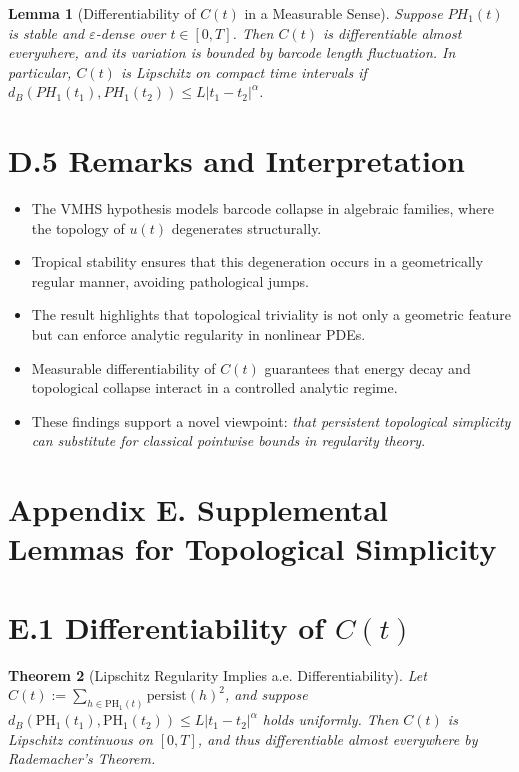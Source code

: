 \documentclass[11pt]{article}
\newtheorem{theorem}{Theorem}[section]
\newtheorem{lemma}[theorem]{Lemma}
\theoremstyle{definition}
\begin{document}
\begin{lemma}[Differentiability of $C(t)$ in a Measurable Sense]
Suppose $PH_1(t)$ is stable and $\varepsilon$-dense over $t \in [0,T]$. Then $C(t)$ is differentiable almost everywhere, and its variation is bounded by barcode length fluctuation. In particular, $C(t)$ is Lipschitz on compact time intervals if $d_B(PH_1(t_1),PH_1(t_2)) \leq L |t_1 - t_2|^\alpha$.
\end{lemma}

\section*{D.5 Remarks and Interpretation}
\begin{itemize}
  \item The VMHS hypothesis models barcode collapse in algebraic families, where the topology of $u(t)$ degenerates structurally.
  \item Tropical stability ensures that this degeneration occurs in a geometrically regular manner, avoiding pathological jumps.
  \item The result highlights that topological triviality is not only a geometric feature but can enforce analytic regularity in nonlinear PDEs.
  \item Measurable differentiability of $C(t)$ guarantees that energy decay and topological collapse interact in a controlled analytic regime.
  \item These findings support a novel viewpoint: \emph{that persistent topological simplicity can substitute for classical pointwise bounds in regularity theory}.
\end{itemize}


\section{Appendix E. Supplemental Lemmas for Topological Simplicity}
\label{sec:appendixE}

\section*{E.1 Differentiability of $C(t)$}
\begin{theorem}[Lipschitz Regularity Implies a.e. Differentiability]
Let $C(t) := \sum_{h \in \mathrm{PH}_1(t)} \mathrm{persist}(h)^2$, and suppose $d_B(\mathrm{PH}_1(t_1), \mathrm{PH}_1(t_2)) \leq L |t_1 - t_2|^\alpha$ holds uniformly. Then $C(t)$ is Lipschitz continuous on $[0,T]$, and thus differentiable almost everywhere by Rademacher’s Theorem.
\end{theorem}
\end{document}

